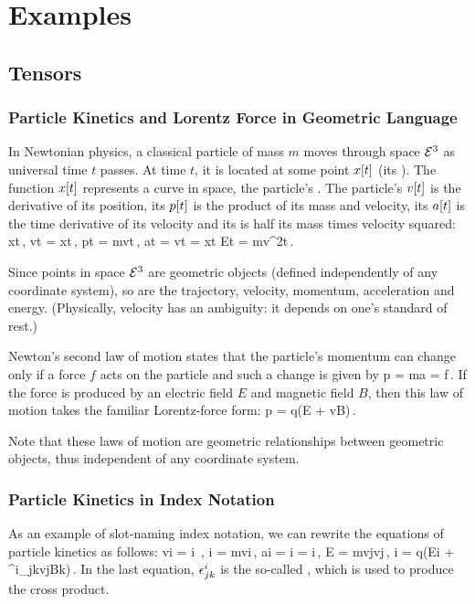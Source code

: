 \section{Examples}

\subsection{Tensors}
\subsubsection{Particle Kinetics and Lorentz Force in Geometric Language}
In Newtonian physics, a classical particle of mass $m$ moves through space $\mathcal{E}^{3}$ as universal time $t$ passes. At time $t$, it is located at some point $x\!\left[{t}\right]$ (its ). The function $x\!\left[{t}\right]$ represents a curve in space, the particle's . The particle's  $v\!\left[{t}\right]$ is the derivative of its position, its  $p\!\left[{t}\right]$ is the product of its mass and velocity, its  $a\!\left[{t}\right]$ is the time derivative of its velocity and its  is half its mass times velocity squared:
\beq
x\vat t\,,\quad 
v\vat t = \dt x\vat t\,,\quad 
p\vat t = mv\vat t\,,\quad
a\vat t = \dt v\vat t = \ddt x\vat t\quad{}\quad
E\vat t = mv^2\vat t\,.
\eeq

Since points in space $\mathcal{E}^{3}$ are geometric objects (defined independently of any coordinate system), so are the trajectory, velocity, momentum, acceleration and energy. (Physically, velocity has an ambiguity: it depends on one's standard of rest.)

Newton's second law of motion states that the particle's momentum can change only if a force $f$ acts on the particle and such a change is given by
\beq
\dt p = ma = f\,.
\eeq
If the force is produced by an electric field $E$ and magnetic field $B$, then this law of motion takes the familiar Lorentz-force form:
\beq
\dt p = q(E + v\cprod B)\,.
\eeq

Note that these laws of motion are geometric relationships between geometric objects, thus independent of any coordinate system.

\subsubsection{Particle Kinetics in Index Notation}
As an example of slot-naming index notation, we can rewrite the equations of particle kinetics as follows:
\beq
     \cnvec vi = i \,,\quad
     i = m\cnvec vi\,,\quad
     \cnvec ai = i = i\,,\quad
            E = m\cnvec vj\covec vj\,,\quad
{}i = q(\cnvec Ei + \lct^i_{jk}\cnvec vj\cnvec Bk)\,.
\eeq
In the last equation, $\epsilon^i_{jk}$ is the so-called , which is used to produce the cross product.

